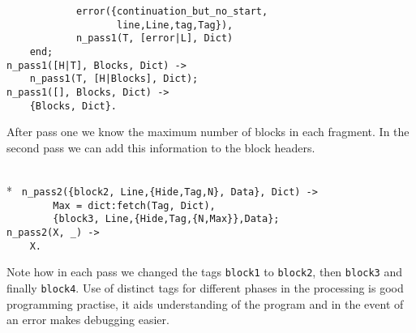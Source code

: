 \begin{flushleft}
\noindent{}%
\verb&            error({continuation_but_no_start,&\\
\noindent{}%
\verb&                   line,Line,tag,Tag}),&\\
\noindent{}%
\verb&            n_pass1(T, [error|L], Dict)&\\
\noindent{}%
\verb&    end;&\\
\noindent{}%
\verb&n_pass1([H|T], Blocks, Dict) ->&\\
\noindent{}%
\verb&    n_pass1(T, [H|Blocks], Dict);&\\
\noindent{}%
\verb&n_pass1([], Blocks, Dict) ->&\\
\noindent{}%
\verb&    {Blocks, Dict}.&\\
\end{flushleft}

    After pass one we know the maximum number of blocks in each fragment.
In the second pass we can add this information to the block headers.

\begin{flushleft}
\label{analysis_2_6}
\\*
\tt
\noindent{}%
\verb&n_pass2({block2, Line,{Hide,Tag,N}, Data}, Dict) ->&\\
\noindent{}%
\verb&        Max = dict:fetch(Tag, Dict),&\\
\noindent{}%
\verb&        {block3, Line,{Hide,Tag,{N,Max}},Data};&\\
\noindent{}%
\verb&n_pass2(X, _) ->&\\
\noindent{}%
\verb&    X.&\\
\end{flushleft}

  Note how in each pass we changed the tags \verb+block1+ to
\verb+block2+, then \verb+block3+ and finally \verb+block4+.  Use of
distinct tags for different phases in the processing is good
programming practise, it aids understanding of the program and in the
event of an error makes debugging easier.

